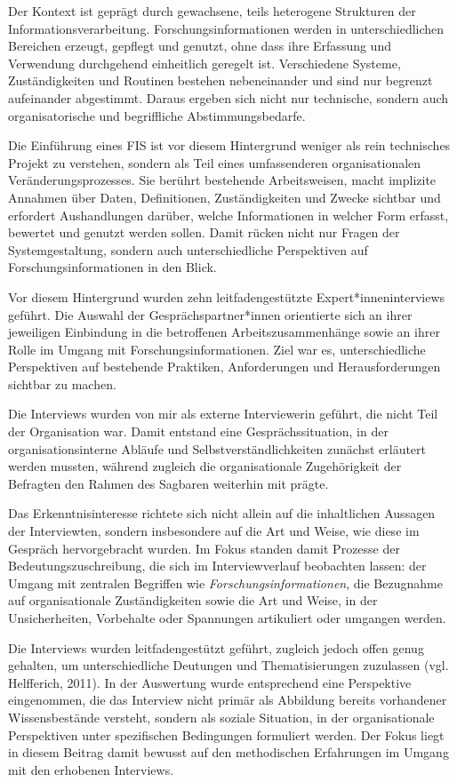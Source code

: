 \documentclass[a4paper,
fontsize=11pt,
oneside,
numbers=noperiodatend,
parskip=half-,
bibliography=totoc,
final
]{scrartcl}
\begin{document}
Der Kontext ist geprägt durch gewachsene, teils heterogene Strukturen
der Informationsverarbeitung. Forschungsinformationen werden in
unterschiedlichen Bereichen erzeugt, gepflegt und genutzt, ohne dass
ihre Erfassung und Verwendung durchgehend einheitlich geregelt ist.
Verschiedene Systeme, Zuständigkeiten und Routinen bestehen
nebeneinander und sind nur begrenzt aufeinander abgestimmt. Daraus
ergeben sich nicht nur technische, sondern auch organisatorische und
begriffliche Abstimmungsbedarfe.

Die Einführung eines FIS ist vor diesem Hintergrund weniger als rein
technisches Projekt zu verstehen, sondern als Teil eines umfassenderen
organisationalen Veränderungsprozesses. Sie berührt bestehende
Arbeitsweisen, macht implizite Annahmen über Daten, Definitionen,
Zuständigkeiten und Zwecke sichtbar und erfordert Aushandlungen darüber,
welche Informationen in welcher Form erfasst, bewertet und genutzt
werden sollen. Damit rücken nicht nur Fragen der Systemgestaltung,
sondern auch unterschiedliche Perspektiven auf Forschungsinformationen
in den Blick.

Vor diesem Hintergrund wurden zehn leitfadengestützte
Expert*inneninterviews geführt. Die Auswahl der Gesprächspartner*innen
orientierte sich an ihrer jeweiligen Einbindung in die betroffenen
Arbeitszusammenhänge sowie an ihrer Rolle im Umgang mit
Forschungsinformationen. Ziel war es, unterschiedliche Perspektiven auf
bestehende Praktiken, Anforderungen und Herausforderungen sichtbar zu
machen.

Die Interviews wurden von mir als externe Interviewerin geführt, die
nicht Teil der Organisation war. Damit entstand eine Gesprächssituation,
in der organisationsinterne Abläufe und Selbstverständlichkeiten
zunächst erläutert werden mussten, während zugleich die organisationale
Zugehörigkeit der Befragten den Rahmen des Sagbaren weiterhin mit
prägte.

Das Erkenntnisinteresse richtete sich nicht allein auf die inhaltlichen
Aussagen der Interviewten, sondern insbesondere auf die Art und Weise,
wie diese im Gespräch hervorgebracht wurden. Im Fokus standen damit
Prozesse der Bedeutungszuschreibung, die sich im Interviewverlauf
beobachten lassen: der Umgang mit zentralen Begriffen wie
\emph{Forschungsinformationen}, die Bezugnahme auf organisationale
Zuständigkeiten sowie die Art und Weise, in der Unsicherheiten,
Vorbehalte oder Spannungen artikuliert oder umgangen werden.

Die Interviews wurden leitfadengestützt geführt, zugleich jedoch offen
genug gehalten, um unterschiedliche Deutungen und Thematisierungen
zuzulassen (vgl. Helfferich, 2011). In der Auswertung wurde entsprechend
eine Perspektive eingenommen, die das Interview nicht primär als
Abbildung bereits vorhandener Wissensbestände versteht, sondern als
soziale Situation, in der organisationale Perspektiven unter
spezifischen Bedingungen formuliert werden. Der Fokus liegt in diesem
Beitrag damit bewusst auf den methodischen Erfahrungen im Umgang mit den
erhobenen Interviews.
\end{document}
